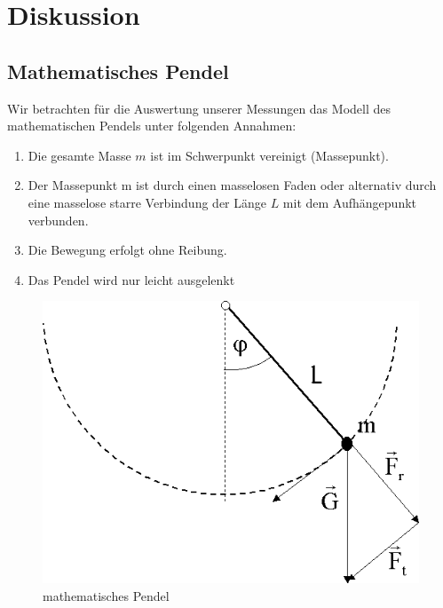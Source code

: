\documentclass[11pt,a4paper,titlepage, ngerman]{article}
\begin{document}
	\section{Diskussion}	
		\label{Diskussion}		
		
		\subsection{Mathematisches Pendel}
		\label{pendel}
		
			Wir betrachten für die Auswertung unserer Messungen das Modell des mathematischen Pendels unter folgenden Annahmen:
			
			\begin{enumerate}
				\item Die gesamte Masse $m$ ist im Schwerpunkt vereinigt (Massepunkt).
				\item Der Massepunkt m ist durch einen masselosen Faden oder alternativ durch eine masselose starre Verbindung der Länge $L$ mit dem Aufhängepunkt verbunden.
				\item Die Bewegung erfolgt ohne Reibung.
				\item Das Pendel wird nur leicht ausgelenkt %
			\end{enumerate}
			
			\begin{figure}[ht]
				\centering
				\includegraphics[scale=0.4]{mathematischesPendel.png}		
				\caption{mathematisches Pendel}
				\label{fig:matpendel}
			\end{figure}
			
\end{document}
